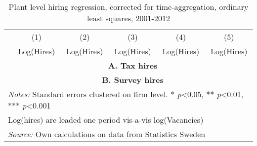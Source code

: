 \begin{table}[htbp]\centering
\def\sym#1{\ifmmode^{#1}\else\(^{#1}\)\fi}
\caption{\label{tab:robust_timeagg_ols} Plant level hiring regression, corrected for time-aggregation, ordinary least squares,  2001-2012}
\begin{tabular}{l*{5}{c}}
\hline\hline
                &\multicolumn{1}{c}{(1)}&\multicolumn{1}{c}{(2)}&\multicolumn{1}{c}{(3)}&\multicolumn{1}{c}{(4)}&\multicolumn{1}{c}{(5)}\\
                &\multicolumn{1}{c}{Log(Hires)}&\multicolumn{1}{c}{Log(Hires)}&\multicolumn{1}{c}{Log(Hires)}&\multicolumn{1}{c}{Log(Hires)}&\multicolumn{1}{c}{Log(Hires)}\\
\hline

\hline
			    &\multicolumn{5}{c}{\textbf{A. Tax hires}} \\
\hline


\hline 

\hline

\hline
			    &\multicolumn{5}{c}{\textbf{B. Survey hires}} \\
\hline



\hline 


\hline\hline
\multicolumn{6}{l}{\footnotesize \emph{Notes:} Standard errors clustered on firm level. * \emph{p}<0.05, ** \emph{p}<0.01, *** \emph{p}<0.001}\\
\multicolumn{6}{l}{\footnotesize Log(hires) are leaded one period vis-a-vis log(Vacancies)}\\
\multicolumn{6}{l}{\footnotesize \emph{Source:} Own calculations on data from Statistics Sweden}\\
\end{tabular}
\end{table}

